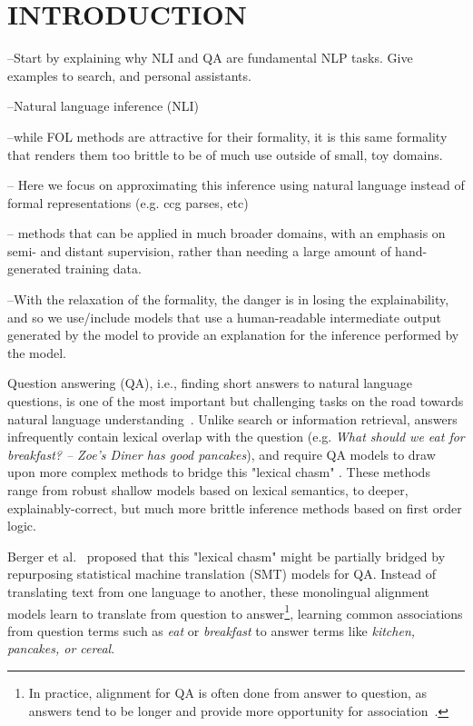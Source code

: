\chapter{INTRODUCTION\label{chapter:introduction}}

--Start by explaining why NLI and QA are fundamental NLP tasks. Give examples to search, and personal assistants.

--Natural language inference (NLI)

--while FOL methods are attractive for their formality, it is this same formality that renders them too brittle to be of much use outside of small, toy domains.

-- Here we focus on approximating this inference using natural language instead of formal representations (e.g. ccg parses, etc)

-- methods that can be applied in much broader domains, with an emphasis on semi- and distant supervision, rather than needing a large amount of hand-generated training data.

--With the relaxation of the formality, the danger is in losing the explainability, and so we use/include models that use a human-readable intermediate output generated by the model to provide an explanation for the inference performed by the model.


Question answering (QA), i.e., finding short answers to natural language questions, is one of the most important but challenging 
tasks on the road towards natural language understanding~\cite{Etzioni:11}. 
Unlike search or information retrieval, answers infrequently contain lexical overlap with the question (e.g. {\em What should we eat for breakfast? -- Zoe's Diner has good pancakes}), and require QA models to draw upon more complex methods to bridge this "lexical chasm" \cite{Berger:00}.  These methods range from robust shallow models based on lexical semantics, to deeper, explainably-correct, but much more brittle inference methods based on first order logic.  

Berger et al.~\citeyear{Berger:00} proposed that this "lexical chasm" might be partially bridged by repurposing statistical machine translation (SMT) models for QA. Instead of translating text from one language to another, these monolingual alignment models learn to translate from question to answer\footnote{In practice, alignment for QA is often done from answer to question, as answers tend to be longer and provide more opportunity for association~\cite{Surdeanu:11}.}, learning common associations from question terms such as {\em eat} or {\em breakfast} to answer terms like {\em kitchen, pancakes, or cereal}.

